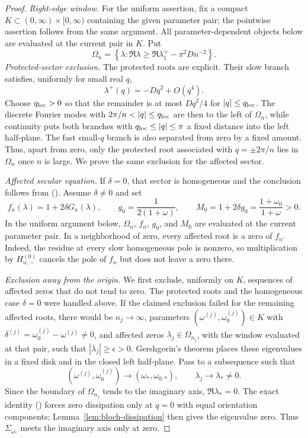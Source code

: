 \documentclass[twoside,10pt]{article}
\numberwithin{equation}{section}
\theoremstyle{slbody}
\theoremstyle{definition}
\theoremstyle{remark}
\renewcommand{\eqref}[1]{%
  \textup{{\normalfont(\oldstylenums{\ref{#1}}}\normalfont)}}
\begin{document}
\begin{proof}
\emph{Right-edge window.}
For the uniform assertion, fix a compact
$K\subset(0,\infty)\times[0,\infty)$ containing the given parameter
pair; the pointwise assertion follows from the same argument.  All
parameter-dependent objects below are evaluated at the current pair in
$K$.  Put
\[
 \Omega_n=\left\{\lambda:\Re\lambda\ge
 \Re\lambda_1^+-\pi^2D n^{-2}\right\}.
\]
\smallskip
\noindent\emph{Protected-sector exclusion.}
The protected roots are explicit.  Their slow branch satisfies, uniformly
for small real $q$,
\begin{equation}\label{eq:slow-dispersion-bound}
 \lambda^+(q)=-Dq^2+O(q^4).
\end{equation}
Choose $q_{\rm loc}>0$ so that the remainder is at most $Dq^2/4$ for
$|q|\le q_{\rm loc}$.  The discrete Fourier modes with
$2\pi/n<|q|\le q_{\rm loc}$ are then to the left
of $\Omega_n$, while continuity puts both branches with
$q_{\rm loc}\le|q|\le\pi$ a fixed distance into the left half-plane.  The fast
small-$q$ branch is also separated from zero by a fixed amount.  Thus,
apart from zero, only the protected root associated with
$q=\pm2\pi/n$ lies
in $\Omega_n$ once $n$ is large.  We prove the same exclusion for the
affected sector.

\smallskip
\noindent\emph{Affected secular equation.}
If $\delta=0$, that sector is homogeneous and the conclusion follows from
\eqref{eq:slow-dispersion-bound}.  Assume $\delta\ne0$ and set
 \begin{equation}\label{eq:threshold-secular-margin}
 f_n(\lambda)=1+2\delta G_n(\lambda),\qquad
 g_0=\frac1{2(1+\omega)},\qquad
 M_0=1+2\delta g_0=\frac{1+\omega_0}{1+\omega}>0.
 \end{equation}
In the uniform argument below, $\Omega_n$, $f_n$, $g_0$, and $M_0$ are
evaluated at the current parameter pair.
In a neighborhood of zero, every affected root is a zero of $f_n$.
Indeed, the residue at every slow homogeneous pole is nonzero, so
multiplication by $H_{n,-}^{(0)}$ cancels the pole of $f_n$ but does not
leave a zero there.

\smallskip
\noindent\emph{Exclusion away from the origin.}
We first exclude, uniformly on $K$, sequences of affected zeros that do
not tend to zero.  The protected roots and the homogeneous case $\delta=0$
were handled above.  If the claimed exclusion failed for the remaining
affected roots, there would be $n_j\to\infty$, parameters
$(\omega^{(j)},\omega_0^{(j)})\in K$ with
$\delta^{(j)}=\omega_0^{(j)}-\omega^{(j)}\ne0$, and affected zeros
$\lambda_j\in\Omega_{n_j}$, with the window evaluated at that pair,
such that $|\lambda_j|\ge\epsilon>0$.
Gershgorin's theorem places these eigenvalues in a fixed disk and in the
closed left half-plane.  Pass to a subsequence such that
\[
 (\omega^{(j)},\omega_0^{(j)})\longrightarrow(\omega_*,\omega_{0,*}),
 \qquad \lambda_j\longrightarrow\lambda_*\ne0.
\]
Since the boundary of $\Omega_{n_j}$ tends to the imaginary axis,
$\Re\lambda_*=0$.  The exact identity
\eqref{eq:bloch-dissipation} forces zero dissipation only at $q=0$ with
equal orientation components; Lemma~\ref{lem:bloch-dissipation} then gives
the eigenvalue zero.  Thus
$\Sigma_{\omega_*}$ meets the imaginary axis only at zero.


\end{proof}
\end{document}
